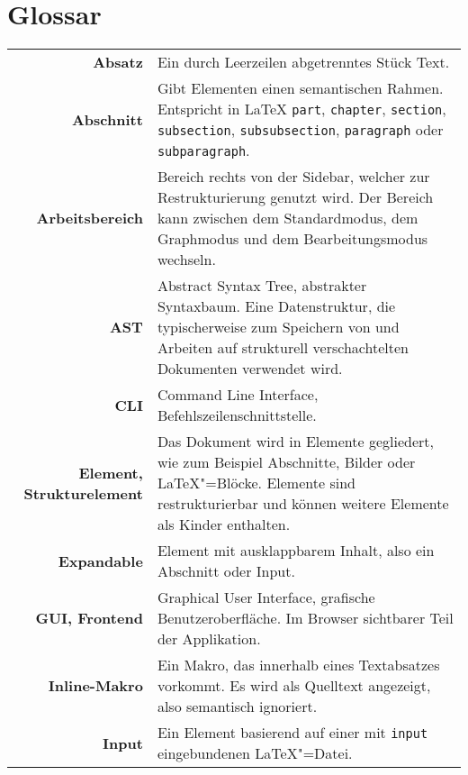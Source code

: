 \clearpage

\section{Glossar}
\label{sec:glossar}

\setlength{\extrarowheight}{2em}

\begin{longtable}{>{\bfseries}rp{9cm}}
  Absatz &
  Ein durch Leerzeilen abgetrenntes Stück Text. \\

  Abschnitt &
  Gibt Elementen einen semantischen Rahmen.
  Entspricht in \LaTeX{} \verb|part|, \verb|chapter|, \verb|section|, \verb|subsection|, \verb|subsubsection|,
  \verb|paragraph| oder \verb|subparagraph|. \\

  Arbeitsbereich &
  Bereich rechts von der Sidebar, welcher zur Restrukturierung genutzt wird.
  Der Bereich kann zwischen dem Standardmodus, dem Graphmodus und dem Bearbeitungsmodus wechseln. \\

  AST &
  Abstract Syntax Tree, abstrakter Syntaxbaum.
  Eine Datenstruktur, die typischerweise zum Speichern von und Arbeiten auf strukturell verschachtelten Dokumenten
  verwendet wird. \\

  CLI &
  Command Line Interface, Befehlszeilenschnittstelle. \\

  Element, Strukturelement &
  Das Dokument wird in Elemente gegliedert, wie zum Beispiel Abschnitte, Bilder oder \LaTeX"=Blöcke.
  Elemente sind restrukturierbar und können weitere Elemente als Kinder enthalten. \\

  Expandable &
  Element mit ausklappbarem Inhalt, also ein Abschnitt oder Input. \\

  GUI, Frontend &
  Graphical User Interface, grafische Benutzeroberfläche.
  Im Browser sichtbarer Teil der Applikation. \\

  Inline-Makro &
  Ein Makro, das innerhalb eines Textabsatzes vorkommt.
  Es wird als Quelltext angezeigt, also semantisch ignoriert. \\

  Input &
  Ein Element basierend auf einer mit \verb|input| eingebundenen \LaTeX"=Datei. \\


\end{longtable}
